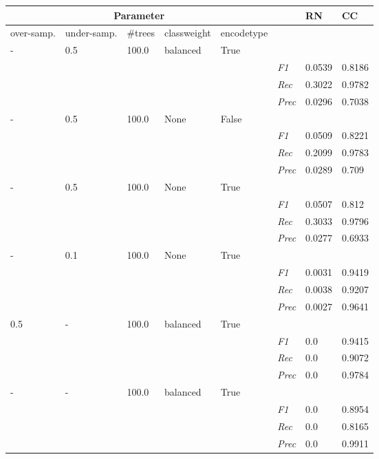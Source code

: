 \begin{table}[]
\tiny
\tabcolsep=0.11cm
\begin{tabularx}{\textwidth}{XXXXX|X|X|X}
\toprule
\multicolumn{5}{c}{Parameter} & & RN &  CC \\ \midrule
over-\newline samp. & under-\newline samp. & \#trees & class\newline weight & encode\newline type  & & & \\ \midrule
- & 0.5 & 100.0 & balanced & True & &  \\
& & & & & \textit{F1} & 0.0539 & 0.8186        \\
& & & & & \textit{Rec} &  0.3022 & 0.9782    \\
& & & & & \textit{Prec} & 0.0296 & 0.7038  \\ \midrule
- & 0.5 & 100.0 & None & False & &  \\
& & & & & \textit{F1} & 0.0509 & 0.8221        \\
& & & & & \textit{Rec} &  0.2099 & 0.9783    \\
& & & & & \textit{Prec} & 0.0289 & 0.709  \\ \midrule
- & 0.5 & 100.0 & None & True & &  \\
& & & & & \textit{F1} & 0.0507 & 0.812        \\
& & & & & \textit{Rec} &  0.3033 & 0.9796    \\
& & & & & \textit{Prec} & 0.0277 & 0.6933  \\ \midrule
- & 0.1 & 100.0 & None & True & &  \\
& & & & & \textit{F1} & 0.0031 & 0.9419        \\
& & & & & \textit{Rec} &  0.0038 & 0.9207    \\
& & & & & \textit{Prec} & 0.0027 & 0.9641  \\ \midrule
0.5 & - & 100.0 & balanced & True & &  \\
& & & & & \textit{F1} & 0.0 & 0.9415        \\
& & & & & \textit{Rec} &  0.0 & 0.9072    \\
& & & & & \textit{Prec} & 0.0 & 0.9784  \\ \midrule
- & - & 100.0 & balanced & True & &  \\
& & & & & \textit{F1} & 0.0 & 0.8954        \\
& & & & & \textit{Rec} &  0.0 & 0.8165    \\
& & & & & \textit{Prec} & 0.0 & 0.9911  \\ \midrule

\end{tabularx}
\end{table}
